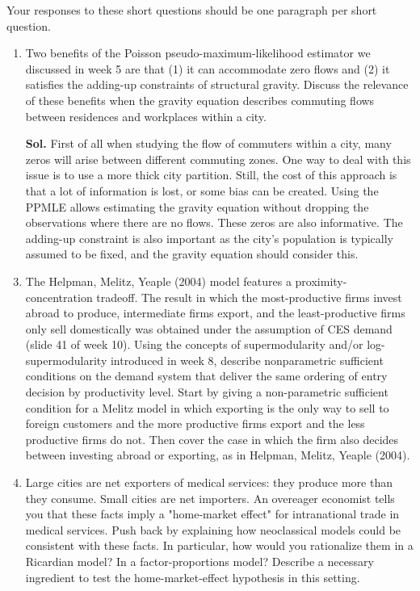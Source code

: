 \documentclass[12pt,oneside,reqno]{amsart}
\begin{document}
Your responses to these short questions should be one paragraph per short question.
\begin{enumerate}[label=\textbf{\roman*.}]
    \item Two benefits of the Poisson pseudo-maximum-likelihood estimator we discussed in week 5 are that (1) it can accommodate zero flows and (2) it satisfies the adding-up constraints of structural gravity. Discuss the relevance of these benefits when the gravity equation describes commuting flows between residences and workplaces within a city.
    \item[\textbf{Sol.}] First of all when studying the flow of commuters within a city, many zeros will arise between different commuting zones. One way to deal with this issue is to use a more thick city partition. Still, the cost of this approach is that a lot of information is lost, or some bias can be created. Using the PPMLE allows estimating the gravity equation without dropping the observations where there are no flows. These zeros are also informative. The adding-up constraint is also important as the city's population is typically assumed to be fixed, and the gravity equation should consider this. 
    \item The Helpman, Melitz, Yeaple (2004) model features a proximity-concentration tradeoff. The result in which the most-productive firms invest abroad to produce, intermediate firms export, and the least-productive firms only sell domestically was obtained under the assumption of CES demand (slide 41 of week 10). Using the concepts of supermodularity and/or log-supermodularity introduced in week 8, describe nonparametric sufficient conditions on the demand system that deliver the same ordering of entry decision by productivity level. Start by giving a non-parametric sufficient condition for a Melitz model in which exporting is the only way to sell to foreign customers and the more productive firms export and the less productive firms do not. Then cover the case in which the firm also decides between investing abroad or exporting, as in Helpman, Melitz, Yeaple (2004).
    \item Large cities are net exporters of medical services: they produce more than they consume. Small cities are net importers. An overeager economist tells you that these facts imply a "home-market effect" for intranational trade in medical services. Push back by explaining how neoclassical models could be consistent with these facts. In particular, how would you rationalize them in a Ricardian model? In a factor-proportions model? Describe a necessary ingredient to test the home-market-effect hypothesis in this setting.

\end{enumerate}
\end{document}
